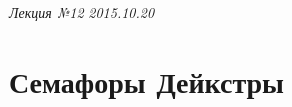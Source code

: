\clearpage
\begin{flushright}
    \textit{Лекция №12}
    \textit{2015.10.20}
\end{flushright}

\section{Семафоры Дейкстры}